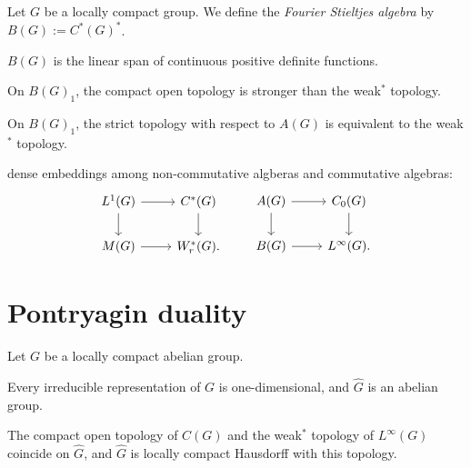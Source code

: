 \documentclass{../../large}
\begin{document}
\begin{prb}
Let $G$ be a locally compact group.
We define the \emph{Fourier Stieltjes algebra} by $B(G):=C^*(G)^*$.
\begin{parts}
\item $B(G)$ is the linear span of continuous positive definite functions.
\item On $B(G)_1$, the compact open topology is stronger than the weak$^*$ topology.
\item On $B(G)_1$, the strict topology with respect to $A(G)$ is equivalent to the weak$^*$ topology.
\end{parts}
\end{prb}
\begin{pf}

\end{pf}


dense embeddings among non-commutative algberas and commutative algebras:
\[\begin{tikzcd}
L^1(G) \rar\dar & C^*(G) \dar\\
M(G) \rar & W_r^*(G).
\end{tikzcd}
\qquad
\begin{tikzcd}
A(G) \rar\dar & C_0(G) \dar\\
B(G) \rar & L^\infty(G).
\end{tikzcd}\]








\section{Pontryagin duality}

\begin{prb}
Let $G$ be a locally compact abelian group.
\begin{parts}
\item Every irreducible representation of $G$ is one-dimensional, and $\hat G$ is an abelian group.
\item The compact open topology of $C(G)$ and the weak$^*$ topology of $L^\infty(G)$ coincide on $\hat G$, and $\hat G$ is locally compact Hausdorff with this topology.
\end{parts}
\end{prb}
\end{document}

